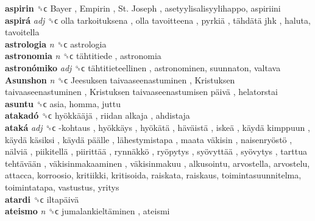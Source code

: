 \textbf{aspirin} ␝ϲ   Bayer ,  Empirin ,  St. Joseph , asetyylisalisyylihappo, aspiriini  \\
\textbf{aspirá} \emph{adj}  ␝ϲ   olla tarkoituksena ,  olla tavoitteena ,  pyrkiä ,  tähdätä jhk , haluta, tavoitella  \\
\textbf{astrologia} \emph{n}  ␝ϲ  astrologia  \\
\textbf{astronomia} \emph{n}  ␝ϲ   tähtitiede , astronomia  \\
\textbf{astronómiko} \emph{adj}  ␝ϲ   tähtitieteellinen , astronominen, suunnaton, valtava  \\
\textbf{Asunshon} \emph{n}  ␝ϲ   Jeesuksen taivaaseenastuminen ,  Kristuksen taivaaseenastuminen ,  Kristuksen taivaaseenastumisen päivä , helatorstai  \\
\textbf{asuntu} ␝ϲ  asia, homma, juttu  \\
\textbf{atakadó} ␝ϲ   hyökkääjä ,  riidan alkaja , ahdistaja  \\
\textbf{ataká} \emph{adj}  ␝ϲ   -kohtaus ,  hyökkäys ,  hyökätä ,  häväistä ,  iskeä ,  käydä kimppuun ,  käydä käsiksi ,  käydä päälle ,  lähestymistapa ,  maata väkisin ,  naisenryöstö ,  nälviä ,  piikitellä ,  piirittää ,  rynnäkkö ,  ryöpytys ,  syövyttää ,  syövytys ,  tarttua tehtävään ,  väkisinmakaaminen ,  väkisinmakuu , alkusointu, arvostella, arvostelu, attacca, korroosio, kritiikki, kritisoida, raiskata, raiskaus, toimintasuunnitelma, toimintatapa, vastustus, yritys  \\
\textbf{atardi} ␝ϲ   iltapäivä   \\
\textbf{ateismo} \emph{n}  ␝ϲ   jumalankieltäminen , ateismi  \\
